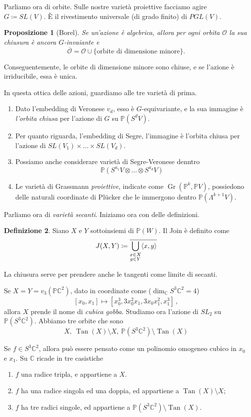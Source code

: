 \documentclass[a4paper, 11pt]{article}
\theoremstyle{definition}
\newtheorem{Def}{Definizione}[section]
\theoremstyle{plain}
\newtheorem{Prop}[Def]{Proposizione}
\DeclarePairedDelimiter{\ang}{\langle}{\rangle}
\newcommand{\PP}{\mathbb{P}}
\newcommand{\C}{\mathbb{C}}
\newcommand{\deff}{\coloneqq}
\DeclareMathOperator{\Tan}{Tan}
\DeclareMathOperator{\Gr}{Gr}
\begin{document}
Parliamo ora di orbite. Sulle nostre varietà proiettive facciamo agire $G \deff SL(V)$. È il rivestimento universale (di grado finito) di $PGL(V)$. 
\begin{Prop}[Borel]
	Se un'azione è algebrica, allora per ogni orbita $\mathcal{O}$ la sua chiusura è ancora $G$-invaiante e 
	\[
		\overline{\mathcal{O}} = \mathcal{O} \cup \{\text{orbite di dimensione minore}\}.
	\]
\end{Prop}
Conseguentemente, le orbite di dimensione minore sono chiuse, e se l'azione è irriducibile, essa è unica.

In questa ottica delle azioni, guardiamo alle tre varietà di prima.
\begin{enumerate}
	\item Dato l'embedding di Veronese $v_d$, esso è $G$-equivariante, e la sua immagine è \emph{l'orbita chiusa} per l'azione di $G$ su $\PP(S^dV)$. 
	
	\item Per quanto riguarda, l'embedding di Segre, l'immagine è l'orbita chiusa per l'azione di $SL(V_1) \times \dots\times SL(V_d)$.
	
	\item Possiamo anche considerare varietà di Segre-Veronese denntro 
	\[
		\PP(S^{a_1}V \otimes \dots \otimes S^{a_d}V)
	\]
	\item Le varietà di Grassmann \emph{proiettive}, indicate come $\Gr(\PP^k, \PP V)$, possiedono delle naturali coordinate di Plücker che le immergono dentro $\PP(\Lambda^{k+1} V)$.
\end{enumerate}

Parliamo ora di \emph{varietà secanti}. Iniziamo ora con delle definizioni.
\begin{Def}
	Siano $X$ e $Y$ sottoinsiemi di $\PP(W)$. Il Join è definito come
	\[
		J(X,Y) \deff \overline{\bigcup_{\substack{x \in X \\ y \in Y}} \ang{x,y}}
	\]
\end{Def}
La chiusura serve per prendere anche le tangenti come limite di secanti.


Se $X = Y = v_3(\PP\C^2)$, dato in coordinate come ($\dim_\C S^3\C^2 = 4$)
\[
	[x_0, x_1] \mapsto [x_0^3, 3x_0^2x_1, 3x_0x_1^2, x_1^3]\,,
\]
allora $X$ prende il nome di \emph{cubica gobba}. Studiamo ora l'azione di $SL_2$ su $\PP(S^3\C^2)$. Abbiamo tre orbite che sono 
\[
	X,\ \Tan(X) \setminus X,\ \PP(S^3\C^2) \setminus \Tan(X)
\]

Se $f \in S^3\C^2$, allora può essere pensato come un polinomio omogeneo cubico in $x_0$ e $x_1$. Su $\C$ ricade in tre casistiche
\begin{enumerate}
	\item $f$ una radice tripla, e appartiene a $X$.
	\item $f$ ha una radice singola ed una doppia, ed appartiene a $\Tan(X) \setminus X$;
	\item $f$ ha tre radici singole, ed appartiene a $\PP(S^3\C^2) \setminus \Tan(X)$.
\end{enumerate}
\end{document}
